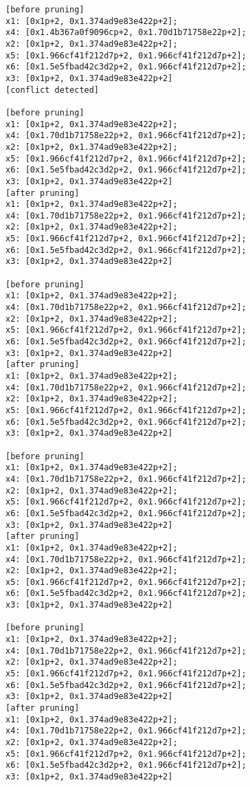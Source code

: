 \begin{lstlisting}
[before pruning]
x1: [0x1p+2, 0x1.374ad9e83e422p+2];
x4: [0x1.4b367a0f9096cp+2, 0x1.70d1b71758e22p+2];
x2: [0x1p+2, 0x1.374ad9e83e422p+2];
x5: [0x1.966cf41f212d7p+2, 0x1.966cf41f212d7p+2];
x6: [0x1.5e5fbad42c3d2p+2, 0x1.966cf41f212d7p+2];
x3: [0x1p+2, 0x1.374ad9e83e422p+2]
[conflict detected]

[before pruning]
x1: [0x1p+2, 0x1.374ad9e83e422p+2];
x4: [0x1.70d1b71758e22p+2, 0x1.966cf41f212d7p+2];
x2: [0x1p+2, 0x1.374ad9e83e422p+2];
x5: [0x1.966cf41f212d7p+2, 0x1.966cf41f212d7p+2];
x6: [0x1.5e5fbad42c3d2p+2, 0x1.966cf41f212d7p+2];
x3: [0x1p+2, 0x1.374ad9e83e422p+2]
[after pruning]
x1: [0x1p+2, 0x1.374ad9e83e422p+2];
x4: [0x1.70d1b71758e22p+2, 0x1.966cf41f212d7p+2];
x2: [0x1p+2, 0x1.374ad9e83e422p+2];
x5: [0x1.966cf41f212d7p+2, 0x1.966cf41f212d7p+2];
x6: [0x1.5e5fbad42c3d2p+2, 0x1.966cf41f212d7p+2];
x3: [0x1p+2, 0x1.374ad9e83e422p+2]

[before pruning]
x1: [0x1p+2, 0x1.374ad9e83e422p+2];
x4: [0x1.70d1b71758e22p+2, 0x1.966cf41f212d7p+2];
x2: [0x1p+2, 0x1.374ad9e83e422p+2];
x5: [0x1.966cf41f212d7p+2, 0x1.966cf41f212d7p+2];
x6: [0x1.5e5fbad42c3d2p+2, 0x1.966cf41f212d7p+2];
x3: [0x1p+2, 0x1.374ad9e83e422p+2]
[after pruning]
x1: [0x1p+2, 0x1.374ad9e83e422p+2];
x4: [0x1.70d1b71758e22p+2, 0x1.966cf41f212d7p+2];
x2: [0x1p+2, 0x1.374ad9e83e422p+2];
x5: [0x1.966cf41f212d7p+2, 0x1.966cf41f212d7p+2];
x6: [0x1.5e5fbad42c3d2p+2, 0x1.966cf41f212d7p+2];
x3: [0x1p+2, 0x1.374ad9e83e422p+2]

[before pruning]
x1: [0x1p+2, 0x1.374ad9e83e422p+2];
x4: [0x1.70d1b71758e22p+2, 0x1.966cf41f212d7p+2];
x2: [0x1p+2, 0x1.374ad9e83e422p+2];
x5: [0x1.966cf41f212d7p+2, 0x1.966cf41f212d7p+2];
x6: [0x1.5e5fbad42c3d2p+2, 0x1.966cf41f212d7p+2];
x3: [0x1p+2, 0x1.374ad9e83e422p+2]
[after pruning]
x1: [0x1p+2, 0x1.374ad9e83e422p+2];
x4: [0x1.70d1b71758e22p+2, 0x1.966cf41f212d7p+2];
x2: [0x1p+2, 0x1.374ad9e83e422p+2];
x5: [0x1.966cf41f212d7p+2, 0x1.966cf41f212d7p+2];
x6: [0x1.5e5fbad42c3d2p+2, 0x1.966cf41f212d7p+2];
x3: [0x1p+2, 0x1.374ad9e83e422p+2]

[before pruning]
x1: [0x1p+2, 0x1.374ad9e83e422p+2];
x4: [0x1.70d1b71758e22p+2, 0x1.966cf41f212d7p+2];
x2: [0x1p+2, 0x1.374ad9e83e422p+2];
x5: [0x1.966cf41f212d7p+2, 0x1.966cf41f212d7p+2];
x6: [0x1.5e5fbad42c3d2p+2, 0x1.966cf41f212d7p+2];
x3: [0x1p+2, 0x1.374ad9e83e422p+2]
[after pruning]
x1: [0x1p+2, 0x1.374ad9e83e422p+2];
x4: [0x1.70d1b71758e22p+2, 0x1.966cf41f212d7p+2];
x2: [0x1p+2, 0x1.374ad9e83e422p+2];
x5: [0x1.966cf41f212d7p+2, 0x1.966cf41f212d7p+2];
x6: [0x1.5e5fbad42c3d2p+2, 0x1.966cf41f212d7p+2];
x3: [0x1p+2, 0x1.374ad9e83e422p+2]


\end{lstlisting}
